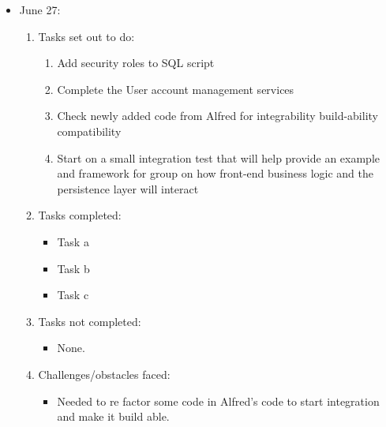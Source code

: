 	\begin{itemize}
		\item June 27:
		\begin{enumerate}
			\item Tasks set out to do:
			\begin{enumerate}
				\item Add security roles to SQL script
				\item Complete the User account management services
				\item Check newly added code from Alfred for integrability build-ability compatibility
				\item Start on a small integration test that will help provide an example and framework for group on how front-end business logic and the persistence layer will interact				
			\end{enumerate}
			\item Tasks completed:
			\begin{itemize}
				\item Task a
				\item Task b
				\item Task c				
			\end{itemize}
			\item Tasks not completed:
			\begin{itemize}
				\item None.
			\end{itemize}
			\item Challenges/obstacles faced:
			\begin{itemize}
				\item Needed to re factor some code in Alfred's code to start integration and make it build able.
			\end{itemize}			
		\end{enumerate}
	\end{itemize}

